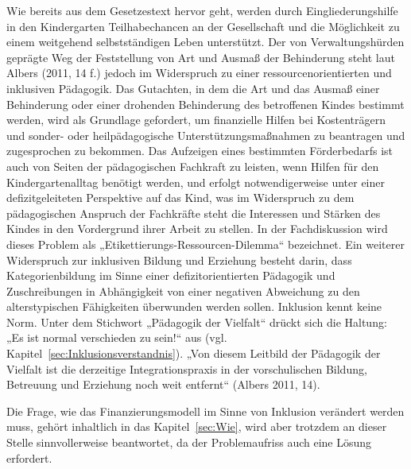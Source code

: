 Wie bereits aus dem Gesetzestext hervor geht, werden durch Eingliederungshilfe in den Kindergarten Teilhabechancen an der Gesellschaft und die Möglichkeit zu einem weitgehend selbstständigen Leben unterstützt. Der von Verwaltungshürden geprägte Weg der Feststellung von Art und Ausmaß der Behinderung steht laut Albers (2011, 14 f.) jedoch im Widerspruch zu einer ressourcenorientierten und inklusiven Pädagogik. Das Gutachten, in dem die Art und das Ausmaß einer Behinderung oder einer drohenden Behinderung des betroffenen Kindes bestimmt werden, wird als Grundlage gefordert, um finanzielle Hilfen bei Kostenträgern und sonder- oder heilpädagogische Unterstützungsmaßnahmen zu beantragen und zugesprochen zu bekommen. Das Aufzeigen eines bestimmten Förderbedarfs ist auch von Seiten der pädagogischen Fachkraft zu leisten, wenn Hilfen für den Kindergartenalltag benötigt werden, und erfolgt notwendigerweise unter einer defizitgeleiteten Perspektive auf das Kind, was im Widerspruch zu dem pädagogischen Anspruch der Fachkräfte steht die Interessen und Stärken des Kindes in den Vordergrund ihrer Arbeit zu stellen. In der Fachdiskussion wird dieses Problem als „Etikettierungs-Ressourcen-Dilemma“ bezeichnet. 
Ein weiterer Widerspruch zur inklusiven Bildung und Erziehung besteht darin, dass Kategorienbildung im Sinne einer defizitorientierten Pädagogik und Zuschreibungen in Abhängigkeit von einer negativen Abweichung zu den alterstypischen Fähigkeiten überwunden werden sollen. Inklusion kennt keine Norm. Unter dem Stichwort „Pädagogik der Vielfalt“ drückt sich die Haltung: „Es ist normal verschieden zu sein!“ aus (vgl. Kapitel~\ref{sec:Inklusionsverstandnis}). „Von diesem Leitbild der Pädagogik der Vielfalt ist die derzeitige Integrationspraxis in der vorschulischen Bildung, Betreuung und Erziehung noch weit entfernt“ (Albers 2011, 14).

Die Frage, wie das Finanzierungsmodell im Sinne von Inklusion verändert werden muss, gehört inhaltlich in das Kapitel~\ref{sec:Wie}, wird aber trotzdem an dieser Stelle sinnvollerweise beantwortet, da der Problemaufriss auch eine Lösung erfordert. 
 
